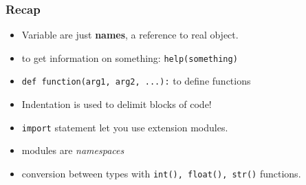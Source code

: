 \documentclass[english,serif,mathserif,xcolor=pdftex,dvipsnames,table]{beamer}
\begin{document}
\begin{frame}
  \frametitle{Recap}
  \begin{itemize}
  \item Variable are just \textbf{names}, a reference to real object.
  \item to get information on something: \lstinline|help(something)|
  \item \lstinline|def function(arg1, arg2, ...):| to define functions
  \item Indentation is used to delimit blocks of code!
  \item \lstinline|import| statement let you use extension modules.
  \item modules are \textit{namespaces}
  \item conversion between types with \lstinline|int(), float(), str()| functions.
  \end{itemize}
\end{frame}
\end{document}
